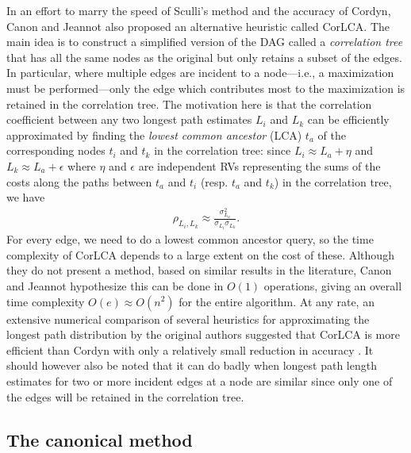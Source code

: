 \documentclass[12pt]{article}
\begin{document}
In an effort to marry the speed of Sculli's method and the accuracy of Cordyn, Canon and Jeannot also proposed an alternative heuristic called CorLCA. The main idea is to construct a simplified version of the DAG called a {\em correlation tree} that has all the same nodes as the original but only retains a subset of the edges. In particular, where multiple edges are incident to a node---i.e., a maximization must be performed---only the edge which contributes most to the maximization is retained in the correlation tree. The motivation here is that the correlation coefficient between any two longest path estimates $L_i$ and $L_k$ can be efficiently approximated by finding the {\em lowest common ancestor} (LCA) $t_{a}$ of the corresponding nodes $t_i$ and $t_k$ in the correlation tree: since $L_i \approx L_a + \eta$ and $L_k \approx L_a + \epsilon$ where $\eta$ and $\epsilon$ are independent RVs representing the sums of the costs along the paths between $t_a$ and $t_i$ (resp. $t_a$ and $t_k$) in the correlation tree, we have
\begin{align*}
  \rho_{L_i, L_k} \approx \frac{\sigma_{L_a}^2}{\sigma_{L_i}\sigma_{L_k}}. %
  \end{align*}
  For every edge, we need to do a lowest common ancestor query, so the time complexity of CorLCA depends to a large extent on the cost of these. Although they do not present a method, based on similar results in the literature, Canon and Jeannot hypothesize this can be done in $O(1)$ operations, giving an overall time complexity $O(e) \approx O(n^2)$ for the entire algorithm. At any rate, an extensive numerical comparison of several heuristics for approximating the longest path distribution by the original authors suggested that CorLCA is more efficient than Cordyn with only a relatively small reduction in accuracy \cite{can16}. It should however also be noted that it can do badly when longest path length estimates for two or more incident edges at a node are similar since only one of the edges will be retained in the correlation tree.

\subsection{The canonical method}
\label{subsect.canonical}
\end{document}

